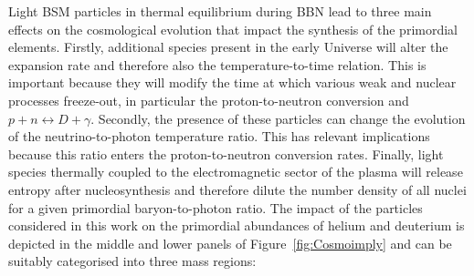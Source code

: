 \noindent Light BSM particles in thermal equilibrium during BBN lead to three main effects on the cosmological evolution that impact the synthesis of the primordial elements. Firstly, additional species present in the early Universe will alter the expansion rate and therefore also the temperature-to-time relation. This is important because they will modify the time at which various weak and nuclear processes freeze-out, in particular the proton-to-neutron conversion and $p + n \leftrightarrow  D + \gamma$. Secondly, the presence of these particles can change the evolution of the neutrino-to-photon temperature ratio. This has relevant implications because this ratio enters the proton-to-neutron conversion rates. Finally, light species thermally coupled to the electromagnetic sector of the plasma will release entropy after nucleosynthesis and therefore dilute the number density of all nuclei for a given primordial baryon-to-photon ratio. The impact of the particles considered in this work on the primordial abundances of helium and deuterium is depicted in the middle and lower panels of Figure~\ref{fig:Cosmoimply} and can be suitably categorised into three mass regions:
\newpage

